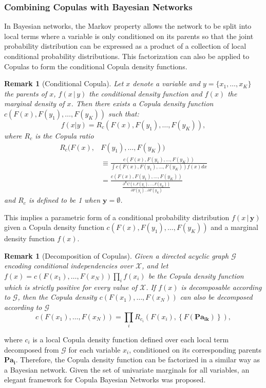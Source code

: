 \documentclass{article}
\newtheorem{remark}[theorem]{Remark}
\begin{document}
\subsubsection{Combining Copulas with Bayesian Networks}
In Bayesian networks, the Markov property allows the network to be split into local terms where a variable is only conditioned on its parents so that the joint probability distribution can be expressed as a product of a collection of local conditional probability distributions. This factorization can also be applied to Copulas to form the conditional Copula density functions.
\begin{remark}[Conditional Copula]
\label{lem:condCplPdf}
Let $x$ denote a variable and $y=\{x_1,\dots ,x_K\}$ the parents of $x$, $f(x\,|\,y)$ the conditional density function and $f(x)$ the marginal density of $x$. Then there exists a Copula density function $c(F(x),F(y_1),\dots ,F(y_K))$ such that: 
\[
f(x|y)=R_c(F(x),F(y_1),\dots , F(y_K)),
\]
where $R_c$ is the Copula ratio
\begin{align}
R_c(F(x),&F(y_1),\dots , F(y_K))\nonumber\\ 
&\equiv \frac{c(F(x),F(y_1),\dots , F(y_K))}{\int c(F(x),F(y_1),\dots , F(y_K))f(x)dx}\nonumber\\
& =\frac{c(F(x),F(y_1),\dots , F(y_K))}{\frac{\partial^KC(1,F(y_1),\dots ,F(y_K))}{\partial F(y_1)\dots \partial F(y_K)}}
\end{align}
and $R_c$ is defined to be 1 when $\mathbf{y}=\emptyset$. 
\end{remark}
This implies a parametric form of a conditional probability distribution $f(x\,|\,\mathbf{y})$ given a Copula density function $c(F(x),F(y_1),\dots , F(y_K))$ and a marginal density function $f(x)$.	
\begin{remark}[Decomposition of Copulas]
\label{lem:decomCpl}
Given a directed acyclic graph $\mathcal{G}$ encoding conditional independencies over $\mathcal{X}$, and let $f(x)=c\left(F\left(x_1\right),\ldots, F\left(x_N\right)\right)\prod_i f\left(x_i\right)$ be the Copula density function which is strictly positive for every value of $\mathcal{X}$. If $f(x)$ is decomposable according to $\mathcal{G}$, then the Copula density $c\left(F\left(x_1\right),\ldots, F\left(x_N\right)\right)$ can also be decomposed according to $\mathcal{G}$
\[
c\left(F\left(x_1\right),\ldots, F\left(x_N\right)\right) = \prod_i R_{c_i}(F(x_i),\left\lbrace F(\mathbf{Pa_{ik}})\right\rbrace),
\]
\end{remark}
where $c_i$ is a local Copula density function defined over each local term decomposed from $\mathcal{G}$ for each variable $x_i$, conditioned on its corresponding parents $\mathbf{Pa_i}$. Therefore, the Copula density function can be factorized in a similar way as a Bayesian network. Given the set of univariate marginals for all variables, an elegant framework for Copula Bayesian Networks was proposed.
\end{document}

